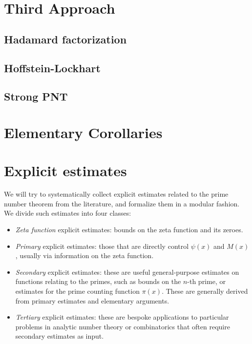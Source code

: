 \chapter{Third Approach}\label{third-approach-chapter}

\section{Hadamard factorization}

\section{Hoffstein-Lockhart}

\section{Strong PNT}

\chapter{Elementary Corollaries}\label{corollaries-chapter}


\chapter{Explicit estimates}\label{explicit-chapter}

We will try to systematically collect explicit estimates related to the prime number theorem from
the literature, and formalize them in a modular fashion.  We divide such estimates into four
classes:

\begin{itemize}
    \item \emph{Zeta function} explicit estimates: bounds on the zeta function and its zeroes.
    \item \emph{Primary} explicit estimates: those that are directly control $\psi(x)$ and $M(x)$, usually via information on the zeta function.
    \item \emph{Secondary} explicit estimates: these are useful general-purpose estimates on
    functions relating to the primes, such as bounds on the $n$-th prime, or estimates for the prime
    counting function $\pi(x)$.  These are generally derived from primary estimates and elementary arguments.
    \item \emph{Tertiary} explicit estimates: these are bespoke applications to particular problems
    in analytic number theory or combinatorics that often require secondary estimates as input.
\end{itemize}

